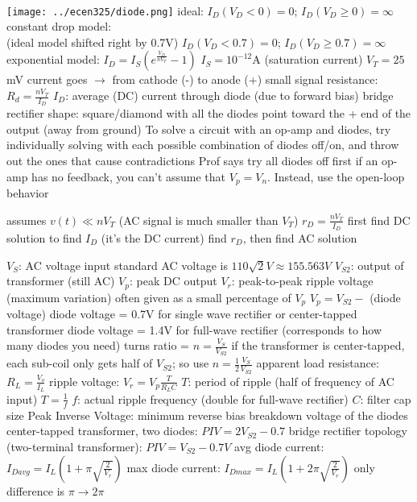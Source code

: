 \documentclass[12pt]{article}
\begin{document}
\begin{spacing}{0.8}
\begin{multicols*}{2}
\begin{flushleft}
\begin{outline}[longenum]
\\
\vspace{-20px}
\hfill\texttt{[image: ../ecen325/diode.png]}
\vspace{-40px}
  \1 ideal:
    \2 $I_D(V_D <    0) = 0$; $I_D(V_D \geq 0) = \infty$
  \1 constant drop model: 
  \\ (ideal model shifted right by 0.7V)
    \2 $I_D(V_D <    0.7) = 0$; $I_D(V_D \geq 0.7) = \infty$
  \1 exponential model: $I_D = I_S ( e^{\frac{V_D}{n V_T}} - 1 )$
    \2 $I_S=10^{-12}$A (saturation current)
    \2 $V_T=25$mV
  \1 current goes $\rightarrow$ from cathode (-) to anode (+)
  \1 small signal resistance: $R_d = \frac{nV_T}{I_D}$
    \2 $I_D$: average (DC) current through diode (due to forward bias)
  \1 bridge rectifier shape: square/diamond with all the diodes point toward the + end of the output (away from ground)
  \1 To solve a circuit with an op-amp and diodes, try individually solving with each possible combination of diodes off/on, and throw out the ones that cause contradictions
    \2 Prof says try all diodes off first
    \2 if an op-amp has no feedback, you can't assume that $V_p=V_n$. Instead, use the open-loop behavior

  \1 assumes $v(t) \ll n V_T$ (AC signal is much smaller than $V_T$)
  \1 $r_D = \frac{nV_T}{I_D}$
  \1 first find DC solution to find $I_D$ (it's the DC current)
  \1 find $r_D$, then find AC solution

  \1 $V_S$: AC voltage input
    \2 standard AC voltage is $110\sqrt{2}V \approx 155.563V$
  \1 $V_{S2}$: output of transformer (still AC)
  \1 $V_p$: peak DC output
  \1 $V_r$: peak-to-peak ripple voltage (maximum variation)
    \2 often given as a small percentage of $V_p$
  \1 $V_p=V_{S2}-$ (diode voltage)
    \2 diode voltage = 0.7V for single wave rectifier or center-tapped transformer
    \2 diode voltage = 1.4V for full-wave rectifier
    \2 (corresponds to how many diodes you need)
  \1 turns ratio = $n=\frac{V_S}{V_{S2}}$
    \2 if the transformer is center-tapped, each sub-coil only gets half of $V_{S2}$; so use $n=\frac{1}{2}\frac{V_S}{V_{S2}}$
  \1 apparent load resistance: $R_L = \frac{V_o}{I_L}$
  \1 ripple voltage: $V_r=V_p\frac{T}{R_L C}$
    \2 $T$: period of ripple (half of frequency of AC input)
        \3 $T=\frac{1}{f}$
    \2 $f$: actual ripple frequency (double for full-wave rectifier)
    \2 $C$: filter cap size
  \1 Peak Inverse Voltage: minimum reverse bias breakdown voltage of the diodes
    \2 center-tapped transformer, two diodes: $PIV = 2V_{S2}-0.7$
    \2 bridge rectifier topology (two-terminal transformer): $PIV = V_{S2}-0.7V$
  \1 avg diode current: $I_{Davg}=I_L \left( 1+\pi\sqrt{\frac{2}{V_r}} \right)$
  \1 max diode current: $I_{Dmax}=I_L \left( 1+2\pi\sqrt{\frac{2}{V_r}} \right)$
    \2 only difference is $\pi \rightarrow 2\pi$


\end{outline}
\end{flushleft}
\end{multicols*}
\end{spacing}
\end{document}
